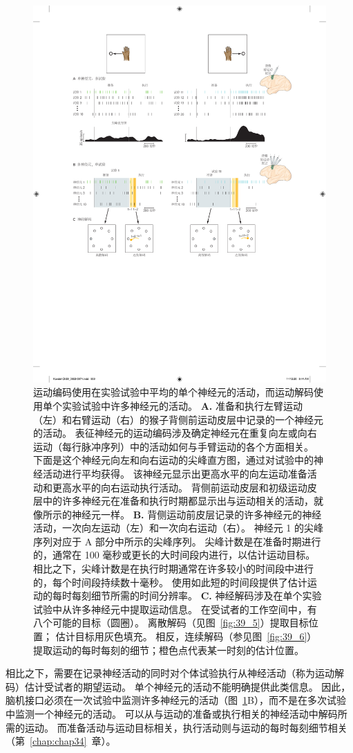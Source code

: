 \begin{figure}[htbp]
	\centering
	\includegraphics[width=0.5\linewidth]{chap39/fig_39_3}
	\caption{运动编码使用在实验试验中平均的单个神经元的活动，而运动解码使用单个实验试验中许多神经元的活动。
		\textbf{A.} 准备和执行左臂运动（左）和右臂运动（右）的猴子背侧前运动皮层中记录的一个神经元的活动。
		表征神经元的运动编码涉及确定神经元在重复向左或向右运动（每行脉冲序列）中的活动如何与手臂运动的各个方面相关。
		下面是这个神经元向左和向右运动的尖峰直方图，通过对试验中的神经活动进行平均获得。
		该神经元显示出更高水平的向左运动准备活动和更高水平的向右运动执行活动。
		背侧前运动皮层和初级运动皮层中的许多神经元在准备和执行时期都显示出与运动相关的活动，就像所示的神经元一样。
		\textbf{B.} 背侧运动前皮层记录的许多神经元的神经活动，一次向左运动（左）和一次向右运动（右）。
		神经元 1 的尖峰序列对应于 A 部分中所示的尖峰序列。
		尖峰计数是在准备时期进行的，通常在 100 毫秒或更长的大时间段内进行，以估计运动目标。
		相比之下，尖峰计数是在执行时期通常在许多较小的时间段中进行的，每个时间段持续数十毫秒。
		使用如此短的时间段提供了估计运动的每时每刻细节所需的时间分辨率。
		\textbf{C.} 神经解码涉及在单个实验试验中从许多神经元中提取运动信息。 在受试者的工作空间中，有八个可能的目标（圆圈）。
		离散解码（见图~\ref{fig:39_5}）提取目标位置； 估计目标用灰色填充。
		相反，连续解码（参见图~\ref{fig:39_6}）提取运动的每时每刻的细节；橙色点代表某一时刻的估计位置。}
	\label{fig:39_3}
\end{figure}



相比之下，需要在记录神经活动的同时对个体试验执行从神经活动（称为运动解码）估计受试者的期望运动。
单个神经元的活动不能明确提供此类信息。
因此，脑机接口必须在一次试验中监测许多神经元的活动（图~\ref{fig:39_3}B），而不是在多次试验中监测一个神经元的活动。
可以从与运动的准备或执行相关的神经活动中解码所需的运动。
而准备活动与运动目标相关，执行活动则与运动的每时每刻细节相关（第~\ref{chap:chap34}~章）。


